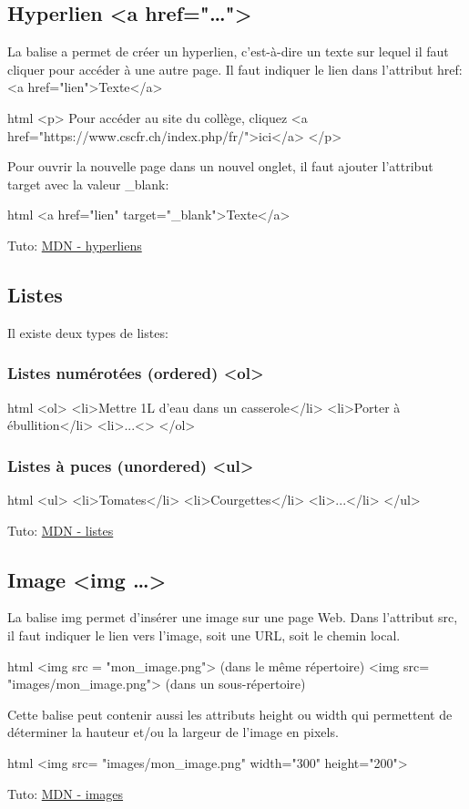 \documentclass[a4paper,11pt]{article}
\begin{document}
\subsection{Hyperlien <a href="\dots">}
La balise a permet de créer un  hyperlien, c'est-à-dire un texte sur lequel il faut cliquer pour accéder à une autre page. Il faut indiquer le lien dans l'attribut href:
<a href="lien">Texte</a>
\begin{code}{html}
<p>
  Pour accéder au site du collège,
  cliquez <a href="https://www.cscfr.ch/index.php/fr/">ici</a>
</p>
\end{code}
Pour ouvrir la nouvelle page dans un nouvel onglet, il faut ajouter l'attribut target avec la valeur \_blank:
\begin{code}{html}
<a href="lien" target="_blank">Texte</a>
\end{code}
Tuto: \href{https://developer.mozilla.org/fr/docs/Web/HTML/Element/a}{MDN - hyperliens}

\subsection{Listes}
Il existe deux types de listes:
\subsubsection{Listes numérotées (ordered) <ol>}
\begin{code}{html}
<ol>
  <li>Mettre 1L d'eau dans un casserole</li>
  <li>Porter à ébullition</li>
  <li>...<\li>
</ol>
\end{code}

\subsubsection{Listes à puces (unordered) <ul>}
\begin{code}{html}
<ul>
  <li>Tomates</li>
  <li>Courgettes</li>
  <li>...</li>
</ul>
\end{code}
Tuto: \href{https://developer.mozilla.org/fr/docs/Web/HTML/Element/li}{MDN - listes}

\subsection{Image <img \dots>}
La balise img permet d'insérer une image sur une page Web. Dans l'attribut src, il faut indiquer le lien vers l'image, soit une URL, soit le chemin local.
\begin{code}{html}
<img src = "mon_image.png"> (dans le même répertoire)
<img src= "images/mon_image.png"> (dans un sous-répertoire)
\end{code}
Cette balise peut contenir aussi les attributs height ou width qui permettent de déterminer la hauteur et/ou la largeur de l'image en pixels.
\begin{code}{html}
<img src= "images/mon_image.png" width="300" height="200">
\end{code}
Tuto: \href{https://developer.mozilla.org/fr/docs/Learn/HTML/Multimedia_and_embedding/Images_in_HTML}{MDN - images}
\end{document}
